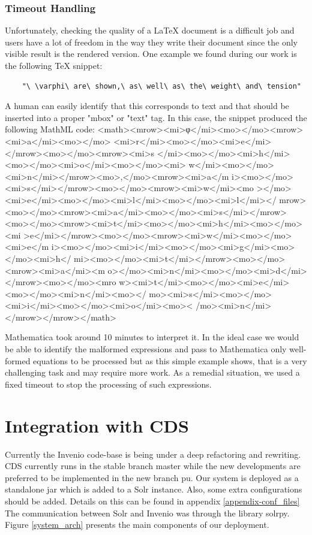 \subsubsection{Timeout Handling}
Unfortunately, checking the quality of a LaTeX document is a difficult job and users have a lot of freedom in the way they write their document since the only visible result is the rendered version. 
One example we found during our work is the following TeX snippet:
\begin{verbatim}
	"\ \varphi\ are\ shown,\ as\ well\ as\ the\ weight\ and\ tension"
\end{verbatim}
A human can easily identify that this corresponds to text and that should be inserted into a proper "mbox" or "text" tag. In this case, the snippet produced the following MathML code:
\small{\codefont <math><mrow><mi>φ</mi><mo></mo><mrow><mi>a</mi><mo></mo>
<mi>r</mi><mo></mo><mi>e</mi></mrow><mo></mo><mrow><mi>s
</mi><mo></mo><mi>h</mi><mo></mo><mi>o</mi><mo></mo><mi>
w</mi><mo></mo><mi>n</mi></mrow><mo>,</mo><mrow><mi>a</m
i><mo></mo><mi>s</mi></mrow><mo></mo><mrow><mi>w</mi><mo
></mo><mi>e</mi><mo></mo><mi>l</mi><mo></mo><mi>l</mi></
mrow><mo></mo><mrow><mi>a</mi><mo></mo><mi>s</mi></mrow>
<mo></mo><mrow><mi>t</mi><mo></mo><mi>h</mi><mo></mo><mi
>e</mi></mrow><mo></mo><mrow><mi>w</mi><mo></mo><mi>e</m
i><mo></mo><mi>i</mi><mo></mo><mi>g</mi><mo></mo><mi>h</
mi><mo></mo><mi>t</mi></mrow><mo></mo><mrow><mi>a</mi><m
o></mo><mi>n</mi><mo></mo><mi>d</mi></mrow><mo></mo><mro
w><mi>t</mi><mo></mo><mi>e</mi><mo></mo><mi>n</mi><mo></
mo><mi>s</mi><mo></mo><mi>i</mi><mo></mo><mi>o</mi><mo><
/mo><mi>n</mi></mrow></mrow></math>
}

Mathematica took around 10 minutes to interpret it.
In the ideal case we would be able to identify the malformed expressions and pass to Mathematica only well-formed equations to be processed but as this simple example shows, that is a very challenging task and may require more work.
As a remedial situation, we used a fixed timeout to stop the processing of such expressions.

\section{Integration with CDS}
Currently the Invenio code-base is being under a deep refactoring and rewriting. CDS currently runs in the stable branch {\codefont master} while the new developments are preferred to be implemented in the new branch {\codefont pu}. 
Our system is deployed as a standalone {\codefont jar} which is added to a Solr instance. Also, some extra configurations should be added. Details on this can be found in appendix \ref{appendix-conf_files}
The communication between Solr and Invenio was through the library {\codefont solrpy}. 
Figure \ref{system_arch} presents the main components of our deployment.

